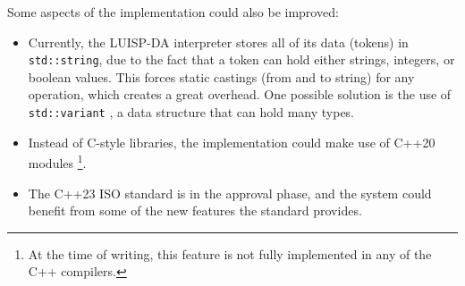 \noindent
Some aspects of the implementation could also be improved:
\begin{itemize}
  \item Currently, the LUISP-DA interpreter stores all of its data (tokens) in \texttt{std::string}, due to the fact that a token can hold either strings, integers, or boolean values. This forces static castings (from and to string) for any operation, which creates a great overhead. One possible solution is the use of \texttt{std::variant} \parencite{stdVariant}, a data structure that can hold many types.
  \item Instead of C-style libraries, the implementation could make use of C++20 modules \parencite{cpp20modules}\footnote{At the time of writing, this feature is not fully implemented in any of the C++ compilers.}.
  \item The C++23 ISO standard is in the approval phase, and the system could benefit from some of the new features the standard provides.
\end{itemize}
